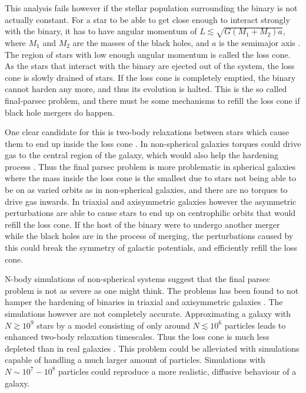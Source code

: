\documentclass[english, oneside]{HYgradu}
\begin{document}
This analysis fails however if the stellar population surrounding the binary is not actually constant. For a star to be able to get close enough to interact strongly with the binary, it has to have angular momentum of $L \lesssim \sqrt{G(M_1 + M_2)a}$, where $M_1$ and $M_2$ are the masses of the black holes, and $a$ is the semimajor axis \citep{bt-galdyn}. The region of stars with low enough angular momentum is called the loss cone. As the stars that interact with the binary are ejected out of the system, the loss cone is slowly drained of stars. If the loss cone is completely emptied, the binary cannot harden any more, and thus its evolution is halted. This is the so called final-parsec problem, and there must be some mechanisms to refill the loss cone if black hole mergers do happen.

One clear candidate for this is two-body relaxations between stars which cause them to end up inside the loss cone \citep{milosavljevic:2003}. In non-spherical galaxies torques could drive gas to the central region of the galaxy, which would also help the hardening process \citep{mayer:2007}.
Thus the final parsec problem is more problematic in spherical galaxies where the mass inside the loss cone is the smallest due to stars not being able to be on as varied orbits as in non-spherical galaxies, and there are no torques to drive gas inwards. In triaxial and axisymmetric galaxies however the asymmetric perturbations are able to cause stars to end up on centrophilic orbits that would refill the loss cone. If the host of the binary were to undergo another merger while the black holes are in the process of merging, the perturbations caused by this could break the  symmetry of galactic potentials, and efficiently refill the loss cone.

N-body simulations of non-spherical systems suggest that the final parsec problem is not as severe as one might think. The problems has been found to not hamper the hardening of binaries in triaxial \citep{berczik:2006} and axisymmetric galaxies \citep{khan:2013}.
The simulations however are not completely accurate. Approximating a galaxy with $N \gtrsim 10^9$ stars by a model consisting of only around $N \lesssim 10^6$ particles leads to enhanced two-body relaxation timescales. Thus the loss cone is much less depleted than in real galaxies \citep{milosavljevic:2003}. This problem could be alleviated with simulations capable of handling a much larger amount of particles. Simulations with $N \sim 10^7 - 10^8$ particles could reproduce a more realistic, diffusive behaviour of a galaxy.
\end{document}
